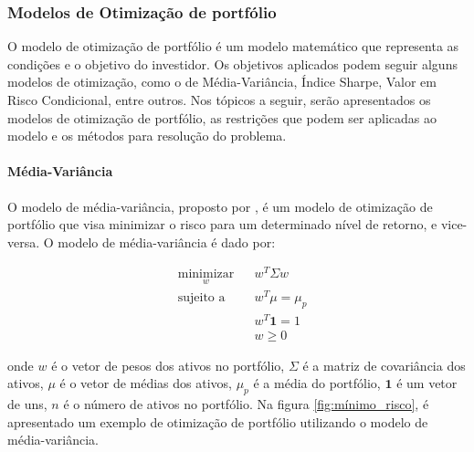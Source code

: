             \subsubsection{Modelos de Otimização de portfólio}

                \ipar O modelo de otimização de portfólio é um modelo matemático que representa as condições e o objetivo do investidor. Os objetivos aplicados podem seguir alguns modelos de otimização, como o de Média-Variância, Índice Sharpe, Valor em Risco Condicional, entre outros. Nos tópicos a seguir, serão apresentados os modelos de otimização de portfólio, as restrições que podem ser aplicadas ao modelo e os métodos para resolução do problema.
                
                \paragraph{Média-Variância}

                    \ipar O modelo de média-variância, proposto por \cite{markowitz1952portfolio}, é um modelo de otimização de portfólio que visa minimizar o risco para um determinado nível de retorno, e vice-versa. O modelo de média-variância é dado por:

                    \begin{equation}
                        \label{eq:markowitz}
                        \begin{aligned}
                            & \underset{w}{\text{minimizar}}
                            & & w^T \Sigma w \\
                            & \text{sujeito a}
                            & & w^T \mu = \mu_p \\
                            & & & w^T \mathbf{1} = 1 \\
                            & & & w \geq 0
                        \end{aligned}
                    \end{equation}

                    \noindent onde $w$ é o vetor de pesos dos ativos no portfólio, $\Sigma$ é a matriz de covariância dos ativos, $\mu$ é o vetor de médias dos ativos, $\mu_p$ é a média do portfólio, $\mathbf{1}$ é um vetor de uns, $n$ é o número de ativos no portfólio. Na figura \ref{fig:mínimo_risco}, é apresentado um exemplo de otimização de portfólio utilizando o modelo de média-variância.

